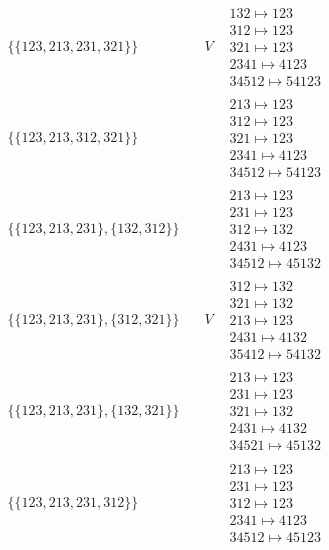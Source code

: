 \begin{tiny}
\begin{align}
\begin{matrix}
\end{matrix}
\\
\{\{123, 213, 231, 321\}\}
\quad
&
V
&
\begin{matrix}
132 \mapsto 123\\312 \mapsto 123\\321 \mapsto 123\\2341 \mapsto 4123\\34512 \mapsto 54123
\end{matrix}
\\
\{\{123, 213, 312, 321\}\}
\quad
&
\phantom{.}
&
\begin{matrix}
213 \mapsto 123\\312 \mapsto 123\\321 \mapsto 123\\2341 \mapsto 4123\\34512 \mapsto 54123
\end{matrix}
\\
\{\{123, 213, 231\}, \{132, 312\}\}
\quad
&
\phantom{.}
&
\begin{matrix}
213 \mapsto 123\\231 \mapsto 123\\312 \mapsto 132\\2431 \mapsto 4123\\34512 \mapsto 45132
\end{matrix}
\\
\{\{123, 213, 231\}, \{312, 321\}\}
\quad
&
V
&
\begin{matrix}
312 \mapsto 132\\321 \mapsto 132\\213 \mapsto 123\\2431 \mapsto 4132\\35412 \mapsto 54132
\end{matrix}
\\
\{\{123, 213, 231\}, \{132, 321\}\}
\quad
&
\phantom{.}
&
\begin{matrix}
213 \mapsto 123\\231 \mapsto 123\\321 \mapsto 132\\2431 \mapsto 4132\\34521 \mapsto 45132
\end{matrix}
\\
\{\{123, 213, 231, 312\}\}
\quad
&
\phantom{.}
&
\begin{matrix}
213 \mapsto 123\\231 \mapsto 123\\312 \mapsto 123\\2341 \mapsto 4123\\34512 \mapsto 45123

\end{matrix}
\end{align}
\end{tiny}

